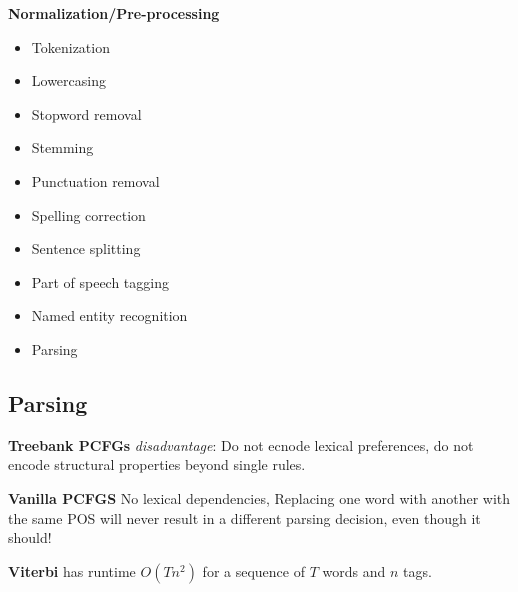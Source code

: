\documentclass[8pt]{extarticle} %
\begin{document}
\begin{multicols*}{3}
\textbf{Normalization/Pre-processing}
\begin{itemize}[label=\textbullet, labelsep=0.3em, leftmargin=0.5em, itemsep=0em]
    \item Tokenization
    \item Lowercasing
    \item Stopword removal
    \item Stemming
    \item Punctuation removal
    \item Spelling correction
    \item Sentence splitting
    \item Part of speech tagging
    \item Named entity recognition
    \item Parsing
\end{itemize}

\subsection*{Parsing}
\textbf{Treebank PCFGs}
\textit{disadvantage}: Do not ecnode lexical preferences, do not encode structural properties beyond single rules.

\textbf{Vanilla PCFGS} No lexical dependencies, Replacing one word with another with the same POS will never result in a different parsing decision, even though it should!

\textbf{Viterbi} has runtime $O(Tn^2)$ for a sequence of $T$ words and $n$ tags. 


\end{multicols*}
\end{document}
